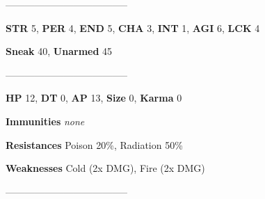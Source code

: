 \documentclass[11pt,a4paper,twocolumn]{book}
\begin{document}
%		
%	
		


--------------------------------------

\noindent
\textbf{STR} 5, \textbf{PER} 4, \textbf{END} 5, \textbf{CHA} 3, \textbf{INT} 1, \textbf{AGI} 6, \textbf{LCK} 4

\noindent
\textbf{Sneak} 40, \textbf{Unarmed} 45	%

--------------------------------------

\noindent
\textbf{HP} 12, \textbf{DT} 0, \textbf{AP} 13, \textbf{Size} 0, \textbf{Karma} 0


\noindent
\textbf{Immunities} \emph{none} %

\noindent
\textbf{Resistances} Poison 20\%, Radiation 50\%%

\noindent
\textbf{Weaknesses} Cold (2x DMG), Fire (2x DMG) %

--------------------------------------
	
\end{document}
